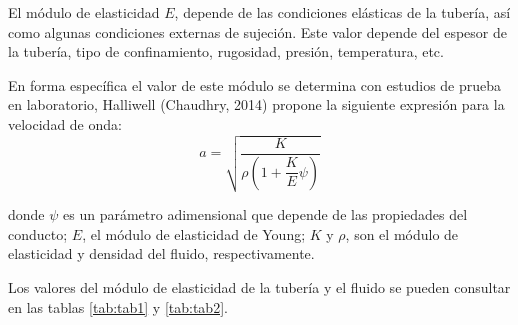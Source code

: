 \documentclass[letterpaper]{report}
\begin{document}
El módulo de elasticidad $E$, depende de las condiciones elásticas de la tubería, así como algunas condiciones externas de sujeción. Este valor depende del espesor de la tubería, tipo de confinamiento, rugosidad, presión, temperatura, etc.\bigskip

En forma específica el valor de este módulo se determina con estudios de prueba en laboratorio, Halliwell (Chaudhry, 2014) propone la siguiente expresión para la velocidad de onda:
\begin{equation}
	a=\sqrt{\dfrac{K}{\rho\left(1+\dfrac{K}{E}\psi\right)}}
\end{equation}

donde $\psi$ es un parámetro adimensional que depende de las propiedades del conducto; $E$, el módulo de elasticidad de Young; $K$ y $\rho$, son el módulo de elasticidad y densidad del fluido, respectivamente.\bigskip

Los valores del módulo de elasticidad de la tubería y el fluido se pueden consultar en las tablas \ref{tab:tab1} y \ref{tab:tab2}.
\end{document}
